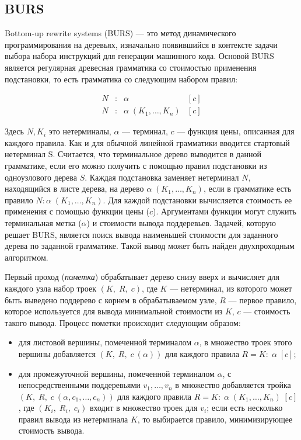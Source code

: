\subsection{BURS}

Bottom-up rewrite systems (BURS)\cite{burs} --- это метод динамического
программирования на деревьях, изначально появившийся в контексте задачи выбора
набора инструкций для генерации машинного кода. Основой BURS является
регулярная древесная грамматика\cite{tata} со стоимостью применения подстановки,
то есть грамматика со следующим набором правил: 

$$
\begin{array}{rcll}
  N &:& \alpha& [c]\\
  N &:& \alpha\; (K_1,\dots,K_n)& [c]
\end{array}
$$

Здесь $N, K_i$ это нетерминалы, $\alpha$ --- терминал,
$c$ --- функция цены, описанная для каждого правила.
Как и для обычной линейной грамматики вводится стартовый
нетерминал S. Считается, что терминальное дерево выводится в
данной грамматике, если его можно получить с помощью правил
подстановки из одноузлового дерева $S$.
Каждая подстановка заменяет нетерминал $N$, находящийся в листе дерева, на дерево 
$\alpha\;(K_1,\dots,K_n)$, если в грамматике есть правило
$N:\alpha\;(K_1,\dots,K_n)$. 
Для каждой подстановки вычисляется стоимость ее применения с помощью
функции цены ($c$).
Аргументами функции могут служить терминальная метка ($\alpha$) и стоимости
вывода поддеревьев.
Задачей, которую решает BURS, является поиск вывода наименьшей стоимости
для заданного дерева по заданной грамматике.
Такой вывод может быть найден двухпроходным алгоритмом.

Первый проход (\emph{пометка}) обрабатывает дерево снизу вверх и вычисляет
для каждого узла набор троек $(K,\;R,\;c)$, где $K$ --- нетерминал, из которого может быть
выведено поддерево с корнем в обрабатываемом узле,
$R$ --- первое правило, которое используется для вывода минимальной стоимости из $K$,
$c$ --- стоимость такого вывода.
Процесс пометки происходит следующим образом:

\begin{itemize}
\item для листовой вершины, помеченной терминалом $\alpha$, в множество троек
этого вершины добавляется $(K,\;R,\;c\:(\alpha))$ для каждого правила $R=K:\;\alpha\;[c]$;
\item для промежуточной вершины, помеченной терминалом $\alpha$,
с непосредственными поддеревьями $v_1,\dots,v_n$
в множество добавляется тройка $(K,\;R,\;c\:(\alpha,c_1,\dots,c_n))$ для каждого правила
$R=K:\;\alpha\;(K_1,\dots,K_n)\;[c]$, где $(K_i,\;R_i,\;c_i)$ входит в множество троек для
$v_i$; если есть несколько правил вывода из нетерминала $K$, то выбирается правило,
минимизирующее стоимость вывода.
\end{itemize}

